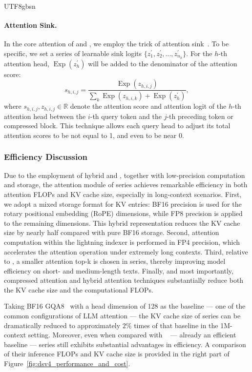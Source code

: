 \begin{CJK*}{UTF8}{gbsn}
\paragraph{Attention Sink.}
In the core attention of \csa{} and \hca{}, we employ the trick of attention sink~\citep{attn_sink,gpt_oss}. 
To be specific, we set a series of learnable sink logits $\{z^{\prime}_1, z^{\prime}_2, ..., z^{\prime}_{n_h}\}$. 
For the $h$-th attention head, $\operatorname{Exp}(z^{\prime}_h)$ will be added to the denominator of the attention score:
\begin{equation}
    s_{h, i, j} = \frac{\operatorname{Exp}(z_{h, i, j})}{\sum_k \operatorname{Exp}(z_{h, i, k}) + \operatorname{Exp}(z^{\prime}_h)},
\end{equation}
where $s_{h, i, j}, z_{h, i, j} \in \mathbb{R}$ denote the attention score and attention logit of the $h$-th attention head between the $i$-th query token and the $j$-th preceding token or compressed block.
This technique allows each query head to adjust its total attention scores to be not equal to 1, and even to be near 0.

\subsubsection{Efficiency Discussion}

Due to the employment of hybrid \csa{} and \hca{}, together with low-precision computation and storage, the attention module of \dsviv{} series achieves remarkable efficiency in both attention FLOPs and KV cache size, especially in long-context scenarios. 
First, we adopt a mixed storage format for KV entries: BF16 precision is used for the rotary positional embedding (RoPE) dimensions, while FP8 precision is applied to the remaining dimensions. 
This hybrid representation reduces the KV cache size by nearly half compared with pure BF16 storage. 
Second, attention computation within the lightning indexer is performed in FP4 precision, which accelerates the attention operation under extremely long contexts. 
Third, relative to \dsviiiII{}, a smaller attention top-k is chosen in \dsviv{} series, thereby improving model efficiency on short- and medium-length texts. 
Finally, and most importantly, compressed attention and hybrid attention techniques substantially reduce both the KV cache size and the computational FLOPs. 

Taking BF16 GQA8~\citep{ainslie2023gqa} with a head dimension of 128 as the baseline --- one of the common configurations of LLM attention --- the KV cache size of \dsviv{} series can be dramatically reduced to approximately $2\%$ times of that baseline in the 1M-context setting.
Moreover, even when compared with \dsviiiII{}~\citep{dsv32} --- already an efficient baseline --- \dsviv{} series still exhibits substantial advantages in efficiency. 
A comparison of their inference FLOPs and KV cache size is provided in the right part of Figure~\ref{fig:dsv4_performance_and_cost}.


\end{CJK*}
